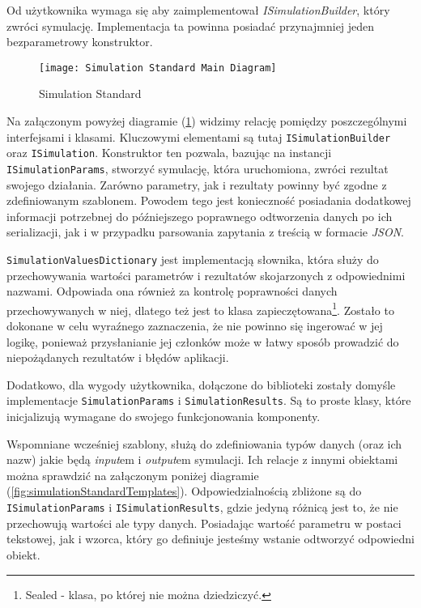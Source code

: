 \par Od użytkownika wymaga się aby zaimplementował \emph{ISimulationBuilder}, który zwróci symulację. Implementacja ta powinna posiadać przynajmniej jeden bezparametrowy konstruktor.

\begin{figure}[H]
	\texttt{[image: Simulation Standard Main Diagram]}
	\caption{Simulation Standard}
	\label{fig:simulationStandard}
\end{figure}

\par Na załączonym powyżej diagramie (\ref{fig:simulationStandard}) widzimy relację pomiędzy poszczególnymi interfejsami i klasami. Kluczowymi elementami są tutaj \texttt{ISimulationBuilder} oraz \texttt{ISimulation}. Konstruktor ten pozwala, bazując na instancji \texttt{ISimulationParams}, stworzyć symulację, która uruchomiona, zwróci rezultat swojego działania. Zarówno parametry, jak i rezultaty powinny być zgodne z zdefiniowanym szablonem. Powodem tego jest konieczność posiadania dodatkowej informacji potrzebnej do późniejszego poprawnego odtworzenia danych po ich serializacji, jak i w przypadku parsowania zapytania z treścią w formacie \emph{JSON}.

\par \texttt{SimulationValuesDictionary} jest implementacją słownika, która służy do przechowywania wartości parametrów i rezultatów skojarzonych z odpowiednimi nazwami. Odpowiada ona również za kontrolę poprawności danych przechowywanych w niej, dlatego też jest to klasa zapieczętowana\footnote{Sealed - klasa, po której nie można dziedziczyć.}. Zostało to dokonane w celu wyraźnego zaznaczenia, że nie powinno się ingerować w jej logikę, ponieważ przysłanianie jej członków może w łatwy sposób prowadzić do niepożądanych rezultatów i błędów aplikacji.

\par Dodatkowo, dla wygody użytkownika, dołączone do biblioteki zostały domyśle implementacje \texttt{SimulationParams} i \texttt{SimulationResults}. Są to proste klasy, które inicjalizują wymagane do swojego funkcjonowania komponenty.

\par Wspomniane wcześniej szablony, służą do zdefiniowania typów danych (oraz ich nazw) jakie będą \emph{input}em i \emph{output}em symulacji. Ich relacje z innymi obiektami można sprawdzić na załączonym poniżej diagramie (\ref{fig:simulationStandardTemplates}). Odpowiedzialnością zbliżone są do \texttt{ISimulationParams} i \texttt{ISimulationResults}, gdzie jedyną różnicą jest to, że nie przechowują wartości ale typy danych. Posiadając wartość parametru w postaci tekstowej, jak i wzorca, który go definiuje jesteśmy wstanie odtworzyć odpowiedni obiekt.

